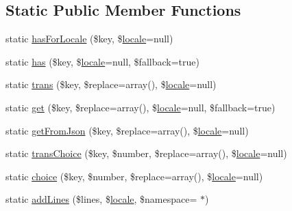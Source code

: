 \subsection*{Static Public Member Functions}
\begin{DoxyCompactItemize}
\item 
static \mbox{\hyperlink{class_illuminate_1_1_support_1_1_facades_1_1_lang_a364ccc2115dc5888b6ed4dd1820f36df}{has\+For\+Locale}} (\$key, \$\mbox{\hyperlink{class_illuminate_1_1_support_1_1_facades_1_1_lang_adf0e7cd50f3430d5e3d7cb161bdfb73c}{locale}}=null)
\item 
static \mbox{\hyperlink{class_illuminate_1_1_support_1_1_facades_1_1_lang_a48506627d20c39b08f17d8dc83ac4be4}{has}} (\$key, \$\mbox{\hyperlink{class_illuminate_1_1_support_1_1_facades_1_1_lang_adf0e7cd50f3430d5e3d7cb161bdfb73c}{locale}}=null, \$fallback=true)
\item 
static \mbox{\hyperlink{class_illuminate_1_1_support_1_1_facades_1_1_lang_a4a3c8c7fd62dea4438d7771b17cb54ac}{trans}} (\$key, \$replace=array(), \$\mbox{\hyperlink{class_illuminate_1_1_support_1_1_facades_1_1_lang_adf0e7cd50f3430d5e3d7cb161bdfb73c}{locale}}=null)
\item 
static \mbox{\hyperlink{class_illuminate_1_1_support_1_1_facades_1_1_lang_af707bce83f27a25456bcfb084c0244dc}{get}} (\$key, \$replace=array(), \$\mbox{\hyperlink{class_illuminate_1_1_support_1_1_facades_1_1_lang_adf0e7cd50f3430d5e3d7cb161bdfb73c}{locale}}=null, \$fallback=true)
\item 
static \mbox{\hyperlink{class_illuminate_1_1_support_1_1_facades_1_1_lang_aa93883fd367d20be584bbabb383d7fb3}{get\+From\+Json}} (\$key, \$replace=array(), \$\mbox{\hyperlink{class_illuminate_1_1_support_1_1_facades_1_1_lang_adf0e7cd50f3430d5e3d7cb161bdfb73c}{locale}}=null)
\item 
static \mbox{\hyperlink{class_illuminate_1_1_support_1_1_facades_1_1_lang_aa37c675b9e5dc2a74f4237873ddaad71}{trans\+Choice}} (\$key, \$number, \$replace=array(), \$\mbox{\hyperlink{class_illuminate_1_1_support_1_1_facades_1_1_lang_adf0e7cd50f3430d5e3d7cb161bdfb73c}{locale}}=null)
\item 
static \mbox{\hyperlink{class_illuminate_1_1_support_1_1_facades_1_1_lang_a6bba86653ed5618ecafd2381900e69f2}{choice}} (\$key, \$number, \$replace=array(), \$\mbox{\hyperlink{class_illuminate_1_1_support_1_1_facades_1_1_lang_adf0e7cd50f3430d5e3d7cb161bdfb73c}{locale}}=null)
\item 
static \mbox{\hyperlink{class_illuminate_1_1_support_1_1_facades_1_1_lang_ae87d32a21d89d3955844b7fc06cc24cb}{add\+Lines}} (\$lines, \$\mbox{\hyperlink{class_illuminate_1_1_support_1_1_facades_1_1_lang_adf0e7cd50f3430d5e3d7cb161bdfb73c}{locale}}, \$namespace=\textquotesingle{} $\ast$\textquotesingle{})

\end{DoxyCompactItemize}

